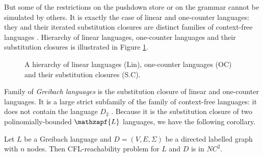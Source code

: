 But some of the restrictions on the pushdown store or on the grammar cannot be simulated by others. It is exactly the case of linear and one-counter languages: they and their iterated substitution closures are distinct families of context-free languages \cite{BEAUQUIER198191}.
Hierarchy of linear languages, one-counter languages and their substitution closures is illustrated in Figure \ref{hierarchy}. 


\begin{figure}
\caption{A hierarchy of linear languages (Lin), one-counter languages (OC) and their substitution closures (S.C).}
\label{hierarchy}       %
\end{figure}
Family of \textit{Greibach languages} is the substitution closure of linear and one-counter languages. It is a large strict subfamily of the family of context-free languages: it does not contain the language $D_2$ \cite{Autebert1997}. Because it is the substitution closure of two polinomially-bounded $\mathzapf{L}$ languages, we have the following corollary.
\begin{corollary} 
Let  $L$ be a Greibach language and $D=(V, E, \Sigma)$ be a directed labelled graph with $n$ nodes. Then CFL-reachability problem for $L$ and $D$ is in $NC^2$.
\end{corollary}
